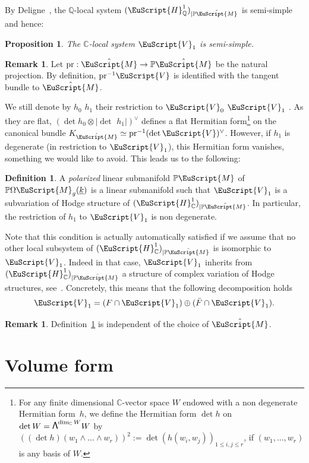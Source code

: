 \documentclass[10pt]{amsart}
\let\mathcal\EuScript
\newcommand\bw{{\hbox{\large$\mathsf{\Lambda}$}}}
\theoremstyle{plain}
\newtheorem{Proposition}[Theorem]{Proposition}
\theoremstyle{definition}
\newtheorem{Definition}[Theorem]{Definition}
\newtheorem{Remark}[Theorem]{Remark}
\def\C{\mathbb{C}}
\newcommand{\Q}{\mathbb{Q}}
\newcommand{\Pb}{\mathbb{P}}
\newcommand{\Mcal}{\mathcal{M}}
\newcommand{\cH}{\mathcal{H}}
\newcommand{\cM}{\mathcal{M}}
\newcommand{\cV}{\mathcal{V}}
\newcommand{\pr}{\mathrm{pr}}
\let\ul\underline
\newcommand{\trate}{\Omega\Mcal_{g}(\ul{k})}
\begin{document}
By Deligne~\cite{Deligne:TH2}, the $\Q$-local system $(\cH^1_{\Q})_{|\Pb\hat\cM}$ is semi-simple and hence:
\begin{Proposition}
The $\C$-local system $\cV_1$ is semi-simple.
\end{Proposition}

\begin{Remark}\label{rk:loc:syst:tangent:bdl}
Let $\pr: \hat{\cM} \to \Pb\hat{\cM}$ be the natural projection. By definition, ${\pr}^{-1}\cV$ is identified with the tangent bundle to $\hat\cM$.
\end{Remark}

We still denote by $h_0$ \resp $h_1$ their restriction to $\cV_0$ \resp $\cV_1$ . As they are flat, $(\det h_0 \otimes |{\det\,}\, h_1|)^\vee$ defines a flat Hermitian form\footnote{For any finite dimensional $\C$-vector space $W$ endowed with a non degenerate Hermitian form~$h$, we define the Hermitian form $\det h$ on $\det W=\bw^{\dim_\C W} W$ by $((\det h)(w_1\wedge\dots\wedge w_r))^2:=\det (h(w_i,w_j))_{1\leq i,j\leq r}$, if $(w_1,\dots,w_r)$ is any basis of $W$.}
on the canonical bundle $K_{\hat\cM}\simeq\pr^{-1}(\det \cV)^\vee$.
However, if $h_1$ is degenerate (in restriction to $\cV_1$), this Hermitian form vanishes, something we would like to avoid. This leads us to the following:

\begin{Definition}\label{def:polarized}
A \emph{polarized} linear submanifold $\Pb\cM$ of $\Pb\trate$ is a linear submanifold such that $\cV_1$ is a subvariation of Hodge structure of $(\cH^1_\C)_{|\Pb\hat\cM}$. In particular, the restriction of $h_1$ to $\cV_1$ is non degenerate.
\end{Definition}

Note that this condition is actually automatically satisfied if we assume that no other local subsystem of $(\cH^1_{\C})_{|\Pb\hat\cM}$ is isomorphic to $\cV_1$. Indeed in that case, $\cV_1$ inherits from $(\cH^1_{\C})_{|\Pb\hat\cM}$ a structure of complex variation of Hodge structures, see~\cite[-13]{Deligne:TFM}.
Concretely, this means that the following decomposition holds
\[\cV_1 = (F \cap \cV_1) \oplus (\bar F \cap \cV_1).\]

\begin{Remark}\label{rk:choice:of:cover}
Definition~\ref{def:polarized} is independent of the choice of $\hat\cM$.
\end{Remark}

\section{Volume form}\label{sec:volform}
\end{document}
